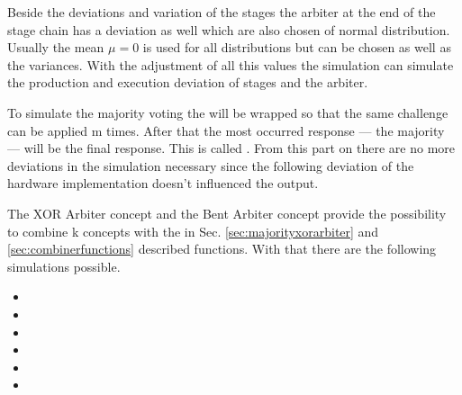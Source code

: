 Beside the deviations and variation of the stages the arbiter at the end of the stage chain has a deviation as well which are also chosen of normal distribution. 
Usually the mean $ \mu = 0 $ is used for all distributions but can be chosen as well as the variances.
With the adjustment of all this values the simulation can simulate the production and execution deviation of stages and the arbiter.

To simulate the majority voting the \apuf will be wrapped so that the same challenge can be applied m times.
After that the most occurred response --- the majority --- will be the final response.
This is called \mpuf.
From this part on there are no more deviations in the simulation necessary since the following deviation of the hardware implementation doesn't influenced the output.

The \ac{XOR} Arbiter concept and the Bent Arbiter concept provide the possibility to combine k concepts with the in Sec. \ref{sec:majorityxorarbiter} and \ref{sec:combinerfunctions} described functions.
With that there are the following \puf simulations possible.

\begin{itemize}
\item \apuf
\item \xpuf
\item \bpuf
\item \mpuf
\item \mxpuf
\item \mbpuf
\end{itemize}

